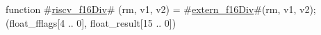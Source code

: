 function #\hyperref[sailRISCVzriscvzyf16Div]{riscv\_f16Div}# (rm, v1, v2) = {
  #\hyperref[sailRISCVzexternzyf16Div]{extern\_f16Div}#(rm, v1, v2);
  (float_fflags[4 .. 0], float_result[15 .. 0])
}
